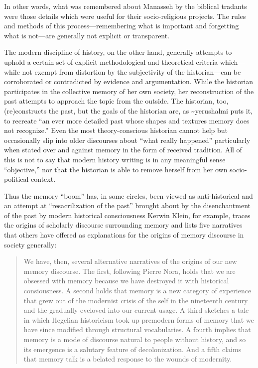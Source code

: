 In other words, what was remembered about Manasseh by the biblical
tradants were those details which were useful for their socio-religious
projects. The rules and methods of this process---remembering what is
important and forgetting what is not---are generally not explicit or
transparent.

The modern discipline of history, on the other hand, generally attempts
to uphold a certain set of explicit methodological and theoretical
criteria which---while not exempt from distortion by the subjectivity of
the historian---can be corroborated or contradicted by evidence and
argumentation. While the historian participates in the collective memory
of her own society, her reconstruction of the past attempts to approach
the topic from the outside. The historian, too, (re)constructs the past,
but the goals of the historian are, as \textasciitilde{}yerushalmi puts
it, to recreate ``an ever more detailed past whose shapes and textures
memory does not recognize.''\autocites[94]{yerushalmi1989}[See
also][532]{verovsek_pgi2016} Even the most theory-conscious historian
cannot help but occasionally slip into older discourses about ``what
really happened'' particularly when stated over and against memory in
the form of received tradition. All of this is not to say that modern
history writing is in any meaningful sense ``objective,'' nor that the
historian is able to remove herself from her own socio-political
context.

Thus the memory ``boom'' has, in some circles, been viewed as
anti-historical and an attempt at ``resacrilization of the past''
brought about by the disenchantment of the past by modern historical
consciousness\autocite[282]{winter2006} Kerwin Klein, for example,
traces the origins of scholarly discourse surrounding memory and lists
five narratives that others have offered as explanations for the origins
of memory discourse in society generally:

\begin{quote}
We have, then, several alternative narratives of the origins of our new
memory discourse. The first, following Pierre Nora, holds that we are
obsessed with memory because we have destroyed it with historical
consiousness. A second holds that memory is a new category of experience
that grew out of the modernist crisis of the self in the nineteenth
century and the gradually eveloved into our current usage. A third
sketches a tale in which Hegelian historicism took up premodern forms of
memory that we have since modified through structural vocabularies. A
fourth implies that memory is a mode of discourse natural to people
without history, and so its emergence is a salutary feature of
decolonization. And a fifth claims that memory talk is a belated
response to the wounds of modernity.\autocite[134]{klein_klein2011}
\end{quote}

